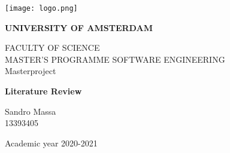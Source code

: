 \thispagestyle{empty}
\begin{titlepage}
  \begin{center}
    \texttt{[image: logo.png]}
  \end{center}
  \bfseries{
    \begin{center}
      \large
     \textbf{UNIVERSITY OF AMSTERDAM}\\
      \normalsize
      
      \vspace*{.5truecm}
      FACULTY OF SCIENCE\\
      \vspace*{.5truecm}
      MASTER'S PROGRAMME SOFTWARE ENGINEERING\\
      \vspace*{2truecm} \large
      Masterproject

     
        
      \LARGE
      \textbf{{Literature Review}}\\



    \end{center}
    \vspace*{2.5truecm} \large
    \begin{flushleft}


      Sandro Massa\\
      13393405\\

    \end{flushleft}
    \vspace*{0.7truecm}
    \begin{center}
      Academic year 2020-2021
    \end{center} \clearpage
  }
\end{titlepage}